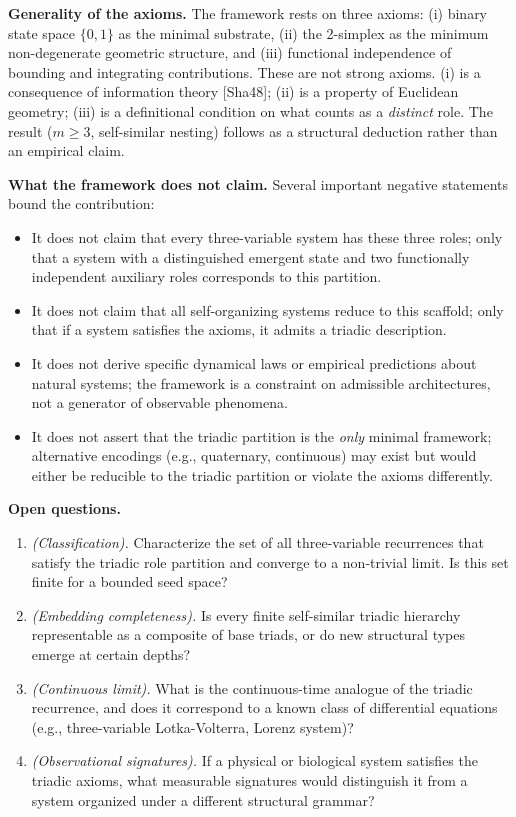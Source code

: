 \documentclass[
  11pt,
  letterpaper,
]{article}
\providecommand{\tightlist}{%
  \setlength{\itemsep}{0pt}\setlength{\parskip}{0pt}}
\begin{document}
\textbf{Generality of the axioms.} The framework rests on three axioms:
(i) binary state space \(\{0, 1\}\) as the minimal substrate, (ii) the
2-simplex as the minimum non-degenerate geometric structure, and (iii)
functional independence of bounding and integrating contributions. These
are not strong axioms. (i) is a consequence of information theory
{[}Sha48{]}; (ii) is a property of Euclidean geometry; (iii) is a
definitional condition on what counts as a \emph{distinct} role. The
result (\(m \ge 3\), self-similar nesting) follows as a structural
deduction rather than an empirical claim.

\textbf{What the framework does not claim.} Several important negative
statements bound the contribution:

\begin{itemize}
\tightlist
\item
  It does not claim that every three-variable system has these three
  roles; only that a system with a distinguished emergent state and two
  functionally independent auxiliary roles corresponds to this
  partition.
\item
  It does not claim that all self-organizing systems reduce to this
  scaffold; only that if a system satisfies the axioms, it admits a
  triadic description.
\item
  It does not derive specific dynamical laws or empirical predictions
  about natural systems; the framework is a constraint on admissible
  architectures, not a generator of observable phenomena.
\item
  It does not assert that the triadic partition is the \emph{only}
  minimal framework; alternative encodings (e.g., quaternary,
  continuous) may exist but would either be reducible to the triadic
  partition or violate the axioms differently.
\end{itemize}

\textbf{Open questions.}

\begin{enumerate}
\def\labelenumi{\arabic{enumi}.}
\tightlist
\item
  \emph{(Classification).} Characterize the set of all three-variable
  recurrences that satisfy the triadic role partition and converge to a
  non-trivial limit. Is this set finite for a bounded seed space?
\item
  \emph{(Embedding completeness).} Is every finite self-similar triadic
  hierarchy representable as a composite of base triads, or do new
  structural types emerge at certain depths?
\item
  \emph{(Continuous limit).} What is the continuous-time analogue of the
  triadic recurrence, and does it correspond to a known class of
  differential equations (e.g., three-variable Lotka-Volterra, Lorenz
  system)?
\item
  \emph{(Observational signatures).} If a physical or biological system
  satisfies the triadic axioms, what measurable signatures would
  distinguish it from a system organized under a different structural
  grammar?
\end{enumerate}
\end{document}
